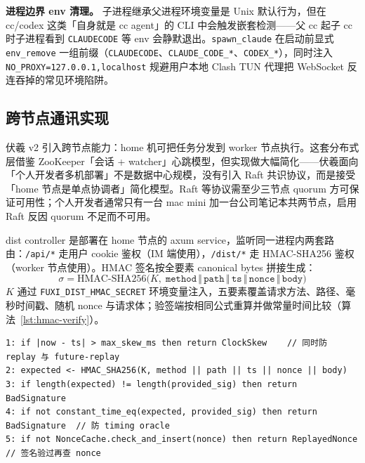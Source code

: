 \textbf{进程边界 env 清理。} 子进程继承父进程环境变量是 Unix 默认行为，但在 cc/codex 这类「自身就是 cc agent」的 CLI 中会触发嵌套检测——父 cc 起子 cc 时子进程看到 \texttt{CLAUDECODE} 等 env 会静默退出。\texttt{spawn\_claude} 在启动前显式 \texttt{env\_remove} 一组前缀（\texttt{CLAUDECODE}、\texttt{CLAUDE\_CODE\_*}、\texttt{CODEX\_*}），同时注入 \texttt{NO\_PROXY=127.0.0.1,localhost} 规避用户本地 Clash TUN 代理把 WebSocket 反连吞掉的常见环境陷阱。

\subsection{跨节点通讯实现}
\label{subsec:dist}

伏羲 v2 引入跨节点能力：home 机可把任务分发到 worker 节点执行。这套分布式层借鉴 ZooKeeper\parencite{hunt2010zookeeper}「会话 + watcher」心跳模型，但实现做大幅简化——伏羲面向「个人开发者多机部署」不是数据中心规模，没有引入 Raft\parencite{ongaro2014raft} 共识协议，而是接受「home 节点是单点协调者」简化模型。Raft 等协议需至少三节点 quorum 方可保证可用性；个人开发者通常只有一台 mac mini 加一台公司笔记本共两节点，启用 Raft 反因 quorum 不足而不可用。

dist controller 是部署在 home 节点的 axum service，监听同一进程内两套路由：\texttt{/api/*} 走用户 cookie 鉴权（IM 端使用），\texttt{/dist/*} 走 HMAC-SHA256 鉴权（worker 节点使用）。HMAC 签名按全要素 canonical bytes 拼接生成：
\begin{equation}
\sigma = \mathrm{HMAC\text{-}SHA256}\bigl(K,\; \texttt{method} \,\Vert\, \texttt{path} \,\Vert\, \texttt{ts} \,\Vert\, \texttt{nonce} \,\Vert\, \texttt{body}\bigr)
\end{equation}
$K$ 通过 \texttt{FUXI\_DIST\_HMAC\_SECRET} 环境变量注入，五要素覆盖请求方法、路径、毫秒时间戳、随机 nonce 与请求体；验签端按相同公式重算并做常量时间比较（算法~\ref{lst:hmac-verify}）。

\begin{lstlisting}[language=Pseudo, caption=分布式请求 HMAC-SHA256 验签（fuxi-cli/src/dist\_auth.rs）, label=lst:hmac-verify]
1: if |now - ts| > max_skew_ms then return ClockSkew    // 同时防 replay 与 future-replay
2: expected <- HMAC_SHA256(K, method || path || ts || nonce || body)
3: if length(expected) != length(provided_sig) then return BadSignature
4: if not constant_time_eq(expected, provided_sig) then return BadSignature  // 防 timing oracle
5: if not NonceCache.check_and_insert(nonce) then return ReplayedNonce       // 签名验过再查 nonce
\end{lstlisting}

